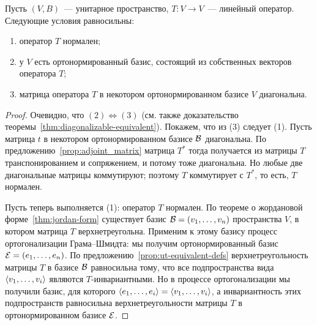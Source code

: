 \begin{theorem}\label{thm:spectral-unitary}
Пусть $(V,B)$~--- унитарное пространство,
$T\colon V\to V$~--- линейный оператор.
Следующие условия равносильны:
\begin{enumerate}
\item оператор $T$ нормален;
\item у $V$ есть ортонормированный базис, состоящий из собственных
векторов оператора $T$;
\item матрица оператора $T$ в некотором ортонормированном базисе
$V$ диагональна.
\end{enumerate}
\end{theorem}
\begin{proof}
Очевидно, что $(2)\Leftrightarrow(3)$ (см. также
доказательство теоремы~\ref{thm:diagonalizable-equivalent}).
Покажем, что из (3) следует (1). Пусть матрица $t$ в некотором
ортонормированном базисе $\mathcal B$ диагональна.
По предложению~\ref{prop:adjoint_matrix}
матрица $T^*$ тогда получается из матрицы $T$ транспонированием
и сопряжением, и потому тоже диагональна. Но любые две диагональные
матрицы коммутируют; поэтому $T$ коммутирует с $T^*$,
то есть, $T$ нормален.

Пусть теперь выполняется (1): оператор $T$ нормален.
По теореме о жордановой форме~\ref{thm:jordan-form} существует
базис $\mathcal B = (v_1,\dots,v_n)$ пространства $V$, в котором матрица $T$
верхнетреугольна. Применим к этому базису процесс ортогонализации
Грама--Шмидта: мы получим ортонормированный базис 
$\mathcal E = (e_1,\dots,e_n)$.
По предложению~\ref{prop:ut-equivalent-defs} верхнетреугольность
матрицы $T$ в базисе $\mathcal B$ равносильна тому, что
все подпространства вида $\langle v_1,\dots,v_i\rangle$ являются
$T$-инвариантными. Но в процессе ортогонализации
мы получили базис, для которого
$\langle e_1,\dots,e_i\rangle = \langle v_1,\dots,v_i\rangle$,
а инвариантность этих подпространств равносильна
верхнетреугольности матрицы $T$ в ортонормированном базисе $\mathcal E$.


\end{proof}
